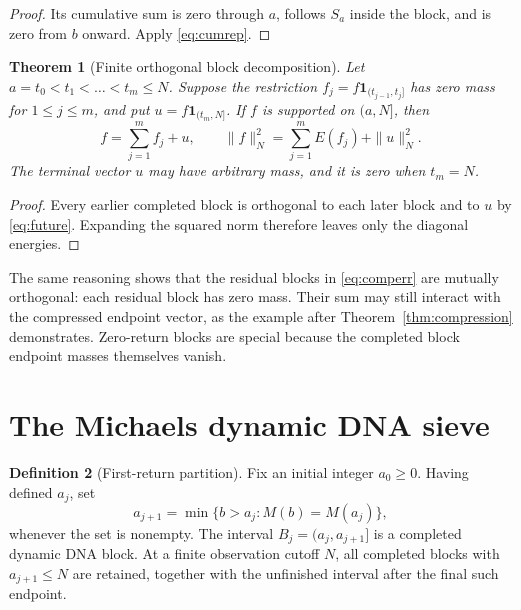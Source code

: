 \documentclass[11pt]{article}
\newtheorem{theorem}{Theorem}[section]
\theoremstyle{definition}
\newtheorem{definition}[theorem]{Definition}
\theoremstyle{remark}
\begin{document}
\begin{proof}
Its cumulative sum is zero through $a$, follows $S_a$ inside the block, and is zero from $b$ onward. Apply \eqref{eq:cumrep}.
\end{proof}

\begin{theorem}[Finite orthogonal block decomposition]\label{thm:decomp}
Let $a=t_0<t_1<\dots<t_m\le N$. Suppose the restriction $f_j=f\mathbf 1_{(t_{j-1},t_j]}$ has zero mass for $1\le j\le m$, and put $u=f\mathbf 1_{(t_m,N]}$. If $f$ is supported on $(a,N]$, then
\begin{equation}\label{eq:decomp}
f=\sum_{j=1}^m f_j+u,\qquad \|f\|_N^2=\sum_{j=1}^m E(f_j)+\|u\|_N^2.
\end{equation}
The terminal vector $u$ may have arbitrary mass, and it is zero when $t_m=N$.
\end{theorem}

\begin{proof}
Every earlier completed block is orthogonal to each later block and to $u$ by \eqref{eq:future}. Expanding the squared norm therefore leaves only the diagonal energies.
\end{proof}

The same reasoning shows that the residual blocks in \eqref{eq:comperr} are mutually orthogonal: each residual block has zero mass. Their sum may still interact with the compressed endpoint vector, as the example after Theorem~\ref{thm:compression} demonstrates. Zero-return blocks are special because the completed block endpoint masses themselves vanish.

\section{The Michaels dynamic DNA sieve}\label{sec:sieve}

\begin{definition}[First-return partition]\label{def:firstreturn}
Fix an initial integer $a_0\ge0$. Having defined $a_j$, set
\begin{equation}\label{eq:firstreturn}
a_{j+1}=\min\{b>a_j : M(b)=M(a_j)\},
\end{equation}
whenever the set is nonempty. The interval $B_j=(a_j,a_{j+1}]$ is a completed dynamic DNA block. At a finite observation cutoff $N$, all completed blocks with $a_{j+1}\le N$ are retained, together with the unfinished interval after the final such endpoint.
\end{definition}
\end{document}
